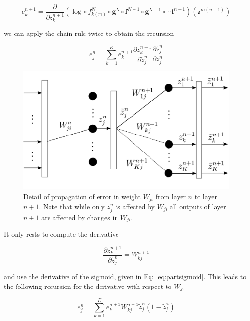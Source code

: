 \begin{equation}
e^{n+1}_k = \frac{\partial}{\partial z^{n+1}_{k}} (\log \circ f_{k(m)}^N \circ \mathbf{g}^N \circ \mathbf{f}^{N-1} \circ \mathbf{g}^{N-1} \circ \cdots \mathbf{f}^{n+1})(\mathbf{z}^{m(n+1)})
\end{equation}

\noindent we can apply the chain rule twice to obtain the
recursion\footnotemark{}

\begin{equation}
e^{n}_j = \sum_{k=1}^K e^{n+1}_k \frac{\partial z^{n+1}_k}{\partial \tilde{z}_{j}^n}\frac{\partial \tilde{z}^n_{j}}{\partial z_{j}^n} 
\label{eq:chainRulRecursion}
\end{equation}

\begin{figure}
\centering
\includegraphics[scale=0.4]{figs/deep_learning/LayerP2.pdf}
\caption{Detail of propagation of error in weight $W_{ji}$ from layer $n$ to
layer $n+1$. Note that while only $z_j^n$ is affected by $W_{ji}$ all outputs
of layer $n+1$ are affected by changes in $W_{ji}$.}
\label{fig:LayerP2}
\end{figure}

\noindent It only rests to compute the derivative

\begin{equation}
\frac{\partial z^{n+1}_k}{\partial \tilde{z}_{j}^n} = W_{kj}^{n+1} 
\end{equation}

\noindent and use the derivative of the sigmoid, given in Eq:
\ref{eq:partsigmoid}. This leads to the following recursion for the derivative
with respect to $W_{ji}$

\begin{equation}
e^{n}_j = \sum_{k=1}^K e^{n+1}_k W_{kj}^{n+1}\tilde{z}^n_{j}(1-\tilde{z}^n_{j})
\end{equation}

